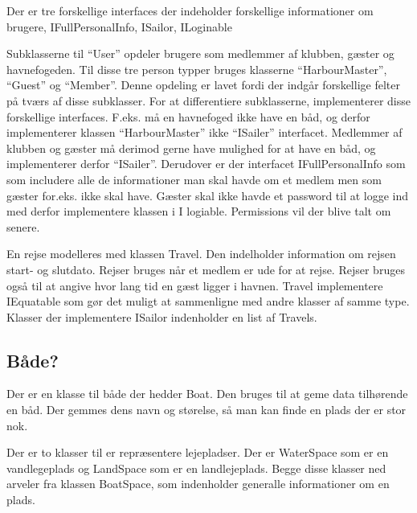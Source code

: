 Der er tre forskellige interfaces der indeholder forskellige informationer om brugere, IFullPersonalInfo, ISailor, ILoginable

Subklasserne til \enquote{User} opdeler brugere som medlemmer af klubben, gæster og havnefogeden. Til disse tre person typper bruges klasserne \enquote{HarbourMaster}, \enquote{Guest} og \enquote{Member}. Denne opdeling er lavet fordi der indgår forskellige felter på tværs af disse subklasser. For at differentiere subklasserne, implementerer disse forskellige interfaces. F.eks. må en havnefoged ikke have en båd, og derfor implementerer klassen \enquote{HarbourMaster} ikke \enquote{ISailer} interfacet. Medlemmer af klubben og gæster må derimod gerne have mulighed for at have en båd, og implementerer derfor \enquote{ISailer}. Derudover er der interfacet IFullPersonalInfo som som includere alle de informationer man skal havde om et medlem men som gæster for.eks. ikke skal have. Gæster skal ikke havde et password til at logge ind med derfor implementere klassen i I logiable. Permissions vil der blive talt om senere.

En rejse modelleres med klassen Travel. Den indelholder information om rejsen start- og slutdato. Rejser bruges når et medlem er ude for at rejse. Rejser bruges også til at angive hvor lang tid en gæst ligger i havnen. Travel implementere IEquatable som gør det muligt at sammenligne med andre klasser af samme type. Klasser der implementere ISailor indenholder en list af Travels.

\subsection{Både?}
\label{sub:bade}

Der er en klasse til både der hedder Boat. Den bruges til at geme data tilhørende en båd. Der gemmes dens navn og størelse, så man kan finde en plads der er stor nok.

Der er to klasser til er repræsentere lejepladser. Der er WaterSpace som er en vandlegeplads og LandSpace som er en landlejeplads. Begge disse klasser ned arveler fra klassen BoatSpace, som indenholder generalle informationer om en plads.

